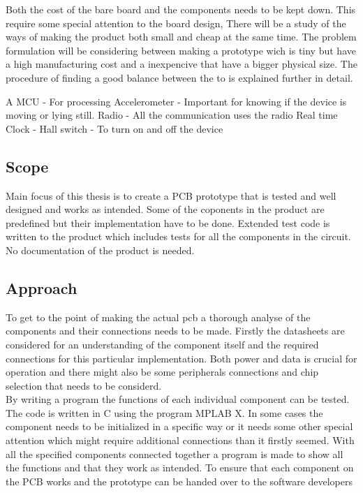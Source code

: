 Both the cost of the bare board and the components needs to be kept down.  This require some special attention to the board design, 
There will be a study of the ways of making the product both small and cheap at the same time. The  problem formulation will be considering between making a prototype wich is tiny but have a high manufacturing cost and a inexpencive that have a bigger physical size. The procedure of finding a good balance between the to is explained further in detail.

A MCU - For processing
Accelerometer - Important for knowing if the device is moving or lying still.
Radio - All the communication uses the radio 
Real time Clock - 
Hall switch - To turn on and off the device

\subsection{Scope}
Main focus of this thesis is to create a PCB prototype that is tested and well designed and works as intended. Some of the coponents in the product are predefined but their implementation have to be done.
Extended test code is written to the product which includes tests for all the components in the circuit.  
No documentation of the product is needed.

\subsection{Approach}
To get to the point of making the actual \gls{pcb} a thorough analyse of the components and their connections needs to be made. Firstly the datasheets are considered for an understanding of the component itself and the required connections for this particular implementation. Both power and data is crucial for operation and there might also be some peripherals connections and chip selection that needs to be considerd. \\
By writing a program the functions of each individual component can be tested. The code is written in C using the program MPLAB X\cite{MPLAB}.  In some cases the component needs to be initialized in a specific way or it needs some other special attention which might require additional connections than it firstly seemed.
With all the specified components connected together a program is made to show all the functions and that they work as intended. 
To ensure that each component on the PCB works and the prototype can be handed over to the software developers  

\thispagestyle{empty}